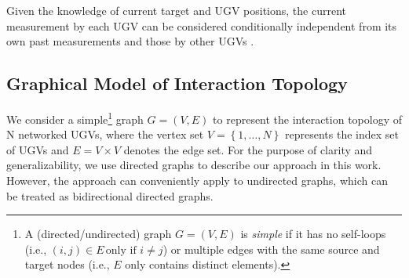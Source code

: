 	
	\begin{rem}
		Given the knowledge of current target and UGV positions, the current measurement by each UGV can be considered conditionally independent from its own past measurements and those by other UGVs \cite{bourgault2003optimal}.
	\end{rem}
	
	
	\subsection{Graphical Model of Interaction Topology}
	We consider a simple\footnote{A (directed/undirected) graph $G=(V,E)$ is \textit{simple} if it has no self-loops (i.e., $\left( i,j\right)\in E\,\text{only if } i\neq j$) or multiple edges with the same source and target nodes (i.e., $E$ only contains distinct elements).} graph $G=(V,E)$ to represent the interaction topology of N networked UGVs, where the vertex set $V=\left\lbrace 1,\dots,N\right\rbrace $ represents the index set of UGVs and $E=V\times V$ denotes the edge set. 
	For the purpose of clarity and generalizability, we use directed graphs to describe our approach in this work.
	However, the approach can conveniently apply to undirected graphs, which can be treated as bidirectional directed graphs.
	
